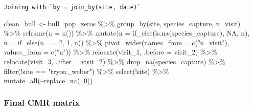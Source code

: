 \documentclass[
  letterpaper,
  DIV=11,
  numbers=noendperiod]{scrartcl}
\newenvironment{Shaded}{\begin{snugshade}}{\end{snugshade}}
\newcommand{\AttributeTok}[1]{\textcolor[rgb]{0.40,0.45,0.13}{#1}}
\newcommand{\ConstantTok}[1]{\textcolor[rgb]{0.56,0.35,0.01}{#1}}
\newcommand{\DecValTok}[1]{\textcolor[rgb]{0.68,0.00,0.00}{#1}}
\newcommand{\FunctionTok}[1]{\textcolor[rgb]{0.28,0.35,0.67}{#1}}
\newcommand{\NormalTok}[1]{\textcolor[rgb]{0.00,0.23,0.31}{#1}}
\newcommand{\OtherTok}[1]{\textcolor[rgb]{0.00,0.23,0.31}{#1}}
\newcommand{\SpecialCharTok}[1]{\textcolor[rgb]{0.37,0.37,0.37}{#1}}
\newcommand{\StringTok}[1]{\textcolor[rgb]{0.13,0.47,0.30}{#1}}
\begin{document}
\begin{verbatim}
Joining with `by = join_by(site, date)`
\end{verbatim}

\begin{Shaded}
\begin{Highlighting}[]
\NormalTok{clean\_bull }\OtherTok{\textless{}{-}}\NormalTok{ bull\_pop\_zeros }\SpecialCharTok{\%\textgreater{}\%}   
  \FunctionTok{group\_by}\NormalTok{(site, species\_capture, n\_visit) }\SpecialCharTok{\%\textgreater{}\%} 
  \FunctionTok{reframe}\NormalTok{(}\AttributeTok{n =} \FunctionTok{n}\NormalTok{()) }\SpecialCharTok{\%\textgreater{}\%} 
  \FunctionTok{mutate}\NormalTok{(}\AttributeTok{n =} \FunctionTok{if\_else}\NormalTok{(}\FunctionTok{is.na}\NormalTok{(species\_capture), }\ConstantTok{NA}\NormalTok{, n),}
         \AttributeTok{n =} \FunctionTok{if\_else}\NormalTok{(n }\SpecialCharTok{==} \DecValTok{2}\NormalTok{, }\DecValTok{1}\NormalTok{, n)) }\SpecialCharTok{\%\textgreater{}\%} 
  \FunctionTok{pivot\_wider}\NormalTok{(}\AttributeTok{names\_from =} \FunctionTok{c}\NormalTok{(}\StringTok{"n\_visit"}\NormalTok{), }\AttributeTok{values\_from =} \FunctionTok{c}\NormalTok{(}\StringTok{"n"}\NormalTok{)) }\SpecialCharTok{\%\textgreater{}\%} 
  \FunctionTok{relocate}\NormalTok{(visit\_1, }\AttributeTok{.before =}\NormalTok{ visit\_2) }\SpecialCharTok{\%\textgreater{}\%} 
  \FunctionTok{relocate}\NormalTok{(visit\_3, }\AttributeTok{.after =}\NormalTok{ visit\_2) }\SpecialCharTok{\%\textgreater{}\%} 
  \FunctionTok{drop\_na}\NormalTok{(species\_capture) }\SpecialCharTok{\%\textgreater{}\%} 
  \FunctionTok{filter}\NormalTok{(}\SpecialCharTok{!}\NormalTok{site }\SpecialCharTok{==} \StringTok{"tryon\_weber"}\NormalTok{) }\SpecialCharTok{\%\textgreater{}\%} 
  \FunctionTok{select}\NormalTok{(}\SpecialCharTok{!}\NormalTok{site) }\SpecialCharTok{\%\textgreater{}\%} 
  \FunctionTok{mutate\_all}\NormalTok{(}\SpecialCharTok{\textasciitilde{}}\FunctionTok{replace\_na}\NormalTok{(.,}\DecValTok{0}\NormalTok{)) }
\end{Highlighting}
\end{Shaded}

\hypertarget{final-cmr-matrix}{%
\subsubsection{Final CMR matrix}\label{final-cmr-matrix}}
\end{document}

